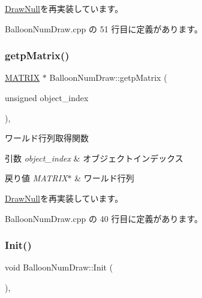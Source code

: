 \mbox{\hyperlink{class_draw_null_a0c1efe55fea325ad277594be6fe1e938}{Draw\+Null}}を再実装しています。



 Balloon\+Num\+Draw.\+cpp の 51 行目に定義があります。

\mbox{\label{class_balloon_num_draw_a9a337ac248ebb73dc32ef407221a6478}} 
\subsubsection{\texorpdfstring{getp\+Matrix()}{getpMatrix()}}
{\footnotesize\ttfamily \mbox{\hyperlink{_matrix_8h_a032295cd9fb1b711757c90667278e744}{M\+A\+T\+R\+IX}} $\ast$ Balloon\+Num\+Draw\+::getp\+Matrix (\begin{DoxyParamCaption}\item[{unsigned}]{object\+\_\+index }\end{DoxyParamCaption})\hspace{0.3cm}{\ttfamily [override]}, {\ttfamily [virtual]}}



ワールド行列取得関数 


\begin{DoxyParams}{引数}
{\em object\+\_\+index} & オブジェクトインデックス \\
\hline
\end{DoxyParams}

\begin{DoxyRetVals}{戻り値}
{\em M\+A\+T\+R\+I\+X$\ast$} & ワールド行列 \\
\hline
\end{DoxyRetVals}


\mbox{\hyperlink{class_draw_null_a9aac059eb3b5d1f77e8bd3aa0647cff9}{Draw\+Null}}を再実装しています。



 Balloon\+Num\+Draw.\+cpp の 40 行目に定義があります。

\mbox{\label{class_balloon_num_draw_a5c31e6bfc16a41a186e47d57b31b7759}} 
\subsubsection{\texorpdfstring{Init()}{Init()}}
{\footnotesize\ttfamily void Balloon\+Num\+Draw\+::\+Init (\begin{DoxyParamCaption}{ }\end{DoxyParamCaption})\hspace{0.3cm}{\ttfamily [override]}, {\ttfamily [virtual]}}



